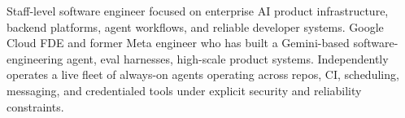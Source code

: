 


Staff-level software engineer focused on enterprise AI product infrastructure, backend platforms, agent workflows, and reliable developer systems. Google Cloud FDE and former Meta engineer who has built a Gemini-based software-engineering agent, eval harnesses, high-scale product systems. Independently operates a live fleet of always-on agents operating across repos, CI, scheduling, messaging, and credentialed tools under explicit security and reliability constraints.







